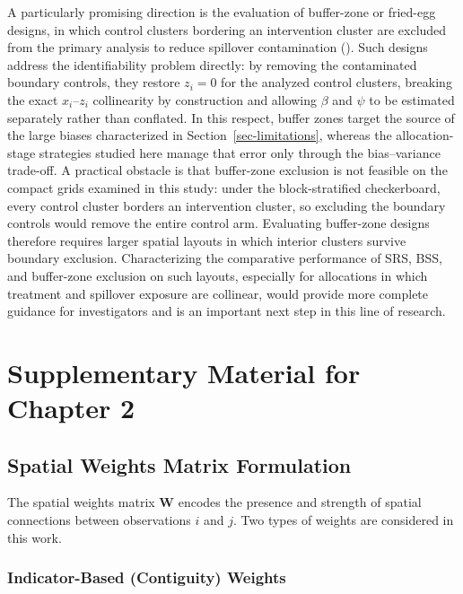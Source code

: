 \documentclass[
  12pt,
  prelim]{bios-prelim}
\begin{document}
A particularly promising direction is the evaluation of buffer-zone or
fried-egg designs, in which control clusters bordering an intervention
cluster are excluded from the primary analysis to reduce spillover
contamination ().
Such designs address the identifiability problem directly: by removing
the contaminated boundary controls, they restore \(z_i = 0\) for the
analyzed control clusters, breaking the exact \(x_i\)--\(z_i\)
collinearity by construction and allowing \(\beta\) and \(\psi\) to be
estimated separately rather than conflated. In this respect, buffer
zones target the source of the large biases characterized in
Section~\ref{sec-limitations}, whereas the allocation-stage strategies
studied here manage that error only through the bias--variance
trade-off. A practical obstacle is that buffer-zone exclusion is not
feasible on the compact grids examined in this study: under the
block-stratified checkerboard, every control cluster borders an
intervention cluster, so excluding the boundary controls would remove
the entire control arm. Evaluating buffer-zone designs therefore
requires larger spatial layouts in which interior clusters survive
boundary exclusion. Characterizing the comparative performance of SRS,
BSS, and buffer-zone exclusion on such layouts, especially for
allocations in which treatment and spillover exposure are collinear,
would provide more complete guidance for investigators and is an
important next step in this line of research.

\appendix
{}

\chapter{Supplementary Material for Chapter
2}\label{supplementary-material-for-chapter-2}

\section{Spatial Weights Matrix Formulation}\label{sec-apx-weights}

The spatial weights matrix \(\mathbf{W}\) encodes the presence and
strength of spatial connections between observations \(i\) and \(j\).
Two types of weights are considered in this work.

\subsection*{Indicator-Based (Contiguity)
Weights}\label{indicator-based-contiguity-weights}
\end{document}
